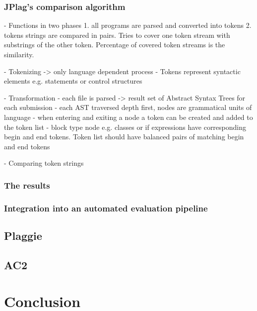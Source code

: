 \documentclass[a4paper, 11pt]{article}
\renewcommand{\\}{\vspace*{0.5\baselineskip} \newline}
\begin{document}
\subsubsection{JPlag's comparison algorithm}

- Functions in two phases 
1. all programs are parsed and converted into tokens
2. tokens strings are compared in pairs. Tries to cover one token stream with substrings of the other token. Percentage of covered token streams is
the similarity. \autocite[p. 10]{JPlagP}

- Tokenizing -> only language dependent process\autocite[p. 10]{JPlagP}
- Tokens represent syntactic elements e.g. statements or control structures\autocite[How are submissions represented? — Notion of Token]{JPlagW4}

- Transformation
- each file is parsed -> result set of Abstract Syntax Trees for each submission
- each AST traversed depth first, nodes are  grammatical units of language
- when entering and exiting a node a token can be created and added to the token list
- block type node e.g. classes or if expressions have corresponding begin and end tokens. 
	Token list should have balanced pairs of matching begin and end tokens

- Comparing token strings

\subsubsection{The results}

\subsubsection{Integration into an automated evaluation pipeline}

\subsection{Plaggie}

\subsection{AC2}

\section{Conclusion}

\newpage

\printbibliography[
	heading=bibintoc,
	title={References}
]

\appendix
\end{document}
